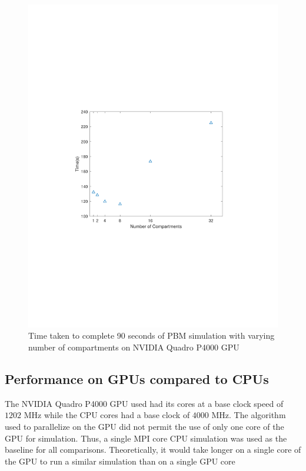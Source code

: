 \documentclass[preprint,10pt,authoryear,review]{elsarticle}
\begin{document}
\begin{linenumbers}
\begin{figure}[h]
\centering
\includegraphics[scale=0.7,trim=110 220 120 220, clip]{desktopgputiming.pdf}
\caption{Time taken to complete 90 seconds of PBM simulation with varying number of compartments 
on NVIDIA Quadro P4000 GPU}
\label{fig:res_gpu_timings}
\end{figure}

     


\subsection{Performance on GPUs compared to CPUs}
The NVIDIA Quadro P4000 GPU used had its cores at a base clock speed of $1202$ MHz while
the CPU cores had a base clock of $4000$ MHz. The algorithm used to parallelize on the GPU 
did not permit the use of only one core of the GPU for simulation. Thus, a single MPI core 
CPU simulation was used as the baseline for all comparisons. Theoretically, it would take 
longer on a single core of the GPU to run a similar simulation than on a single GPU core


\end{linenumbers}
\end{document}
